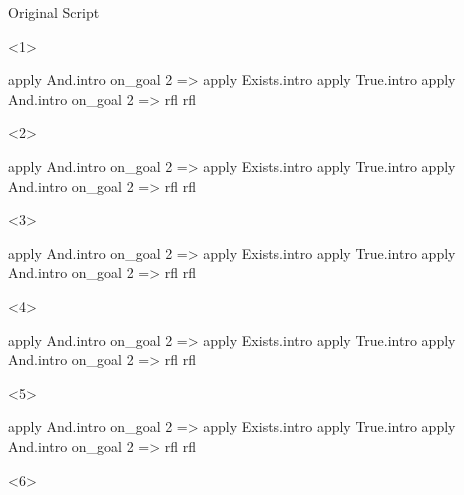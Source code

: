 \begin{frame}[fragile]
  \begin{columns}[onlytextwidth,t]
    \begin{column}{.6\textwidth}
      \begin{block}{Original Script}
        \begin{onlyenv}<1>
          \begin{leancode}
            apply And.intro
            on_goal 2 => apply Exists.intro
            apply True.intro
            apply And.intro
            on_goal 2 => rfl
            rfl
          \end{leancode}
        \end{onlyenv}
        \begin{onlyenv}<2>
          \begin{leancode}[highlightlines=1]
            apply And.intro
            on_goal 2 => apply Exists.intro
            apply True.intro
            apply And.intro
            on_goal 2 => rfl
            rfl
          \end{leancode}
        \end{onlyenv}
        \begin{onlyenv}<3>
          \begin{leancode}[highlightlines=3]
            apply And.intro
            on_goal 2 => apply Exists.intro
            apply True.intro
            apply And.intro
            on_goal 2 => rfl
            rfl
          \end{leancode}
        \end{onlyenv}
        \begin{onlyenv}<4>
          \begin{leancode}[highlightlines=2]
            apply And.intro
            on_goal 2 => apply Exists.intro
            apply True.intro
            apply And.intro
            on_goal 2 => rfl
            rfl
          \end{leancode}
        \end{onlyenv}
        \begin{onlyenv}<5>
          \begin{leancode}[highlightlines=4]
            apply And.intro
            on_goal 2 => apply Exists.intro
            apply True.intro
            apply And.intro
            on_goal 2 => rfl
            rfl
          \end{leancode}
        \end{onlyenv}
        \begin{onlyenv}<6>
          \begin{leancode}[highlightlines=5]

\end{leancode}
\end{onlyenv}
\end{block}
\end{column}
\end{columns}
\end{frame}

